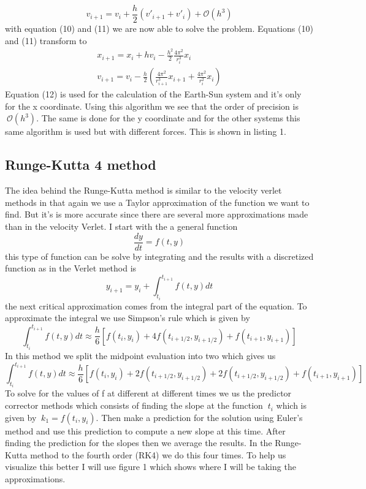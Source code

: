 \documentclass[11pt,a4wide]{article}
\begin{document}
\begin{equation}
	v_{i+1} = v_i + \frac{h}{2}\left(v'_{i+1} + v'_i \right) + \mathcal{O}(h^3)
\end{equation}
with equation (10) and (11) we are now able to solve the problem. Equations (10) and (11) transform to 
\begin{equation}
\begin{split}
	x_{i+1} = x_i + hv_i - \frac{h^2}{2}\frac{4\pi^2}{r_i^3}x_i \\
	v_{i+1} = v_i -\frac{h}{2}\left(\frac{4\pi^2}{r_{i+1}^3}x_{i+1} + \frac{4\pi^2}{r_i^2}x_i\right)
\end{split}
\end{equation}
Equation (12) is used for the calculation of the Earth-Sun system and it's only for the x coordinate. Using this algorithm we see that the order of precision is $\ \mathcal{O}(h^3)$. The same is done for the y coordinate and for the other systems this same algorithm is used but with different forces. This is shown in listing 1. 




\subsection{Runge-Kutta 4 method}
The idea behind the Runge-Kutta method is similar to the velocity verlet methods in that again we use a Taylor approximation of the function we want to find. But it's is more accurate since there are several more approximations made than in the velocity Verlet. I start with the a general function 
\[
	\frac{dy}{dt} = f(t,y)
\]
this type of function can be solve by integrating and the results with a discretized function as in the Verlet method is 
\[
	y_{i+1} = y_i + \int_{t_i}^{t_{i+1}}f(t,y)dt
\]
the next critical approximation comes from the integral part of the equation. To approximate the integral we use Simpson's rule which is given by 
\[
	\int_{t_i}^{t_{i+1}}f(t,y)dt \approx \frac{h}{6}\left[ f(t_i,y_i) + 4f(t_{i+1/2},y_{i+1/2}) + f(t_{i+1},y_{i+1}) \right]
\]
In this method we split the midpoint evaluation into two which gives us 
\[
	\int_{t_i}^{t_{i+1}}f(t,y)dt \approx \frac{h}{6}\left[ f(t_i,y_i) + 2f(t_{i+1/2},y_{i+1/2})+ 2f(t_{i+1/2},y_{i+1/2}) + f(t_{i+1},y_{i+1}) \right]
\]
To solve for the values of f at different at different times we us the predictor corrector methods which consists of finding the slope at the function $\ t_i$ which is given by $\ k_1 = f(t_i, y_i)$. Then make a prediction for the solution using Euler's method and use this prediction to compute a new slope at this time. After finding the prediction for the slopes then we average the results. In the Runge-Kutta method to the fourth order (RK4) we do this four times. To help us visualize this better I will use figure 1 which shows where I will be taking the approximations. 
 
\end{document}
